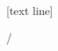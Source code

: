 [text line]{
  \parbox{\linewidth}{\hfill \insertframenumber/\inserttotalframenumber}
 }
\usepackage{hyperref}





